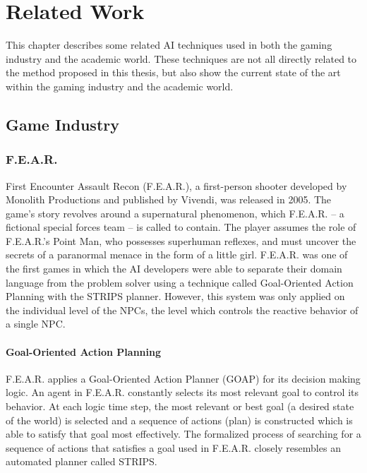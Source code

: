 \chapter{Related Work} %
\label{Chapter3}
This chapter describes some related AI techniques used in both the gaming
industry and the academic world. These techniques are not all directly related
to the method proposed in this thesis, but also show the current state of the
art within the gaming industry and the academic world.
\section{Game Industry}
\subsection{F.E.A.R.}
First Encounter Assault Recon (F.E.A.R.), a first-person shooter developed by
Monolith Productions and published by Vivendi, was released in 2005. The game's
story revolves around a supernatural phenomenon, which F.E.A.R. -- a fictional
special forces team -- is called to contain. The player assumes the role of
F.E.A.R.'s Point Man, who possesses superhuman reflexes, and must uncover the
secrets of a paranormal menace in the form of a little girl. F.E.A.R. was one
of the first games in which the AI developers were able to separate their
domain language from the problem solver using a technique called Goal-Oriented
Action Planning \cite{fear} with the STRIPS \cite{russell} planner. However,
this system was only applied on the individual level of the NPCs, the level
which controls the reactive behavior of a single NPC.
\subsubsection{Goal-Oriented Action Planning}
F.E.A.R. applies a Goal-Oriented Action Planner (GOAP) for its decision making
logic. An agent in F.E.A.R. constantly selects its most relevant goal to
control its behavior. At each logic time step, the most relevant or best goal (a
desired state of the world) is selected and a sequence of actions (plan) is
constructed which is able to satisfy that goal most effectively. The formalized
process of searching for a sequence of actions that satisfies a goal used in
F.E.A.R. closely resembles an automated planner called STRIPS.
